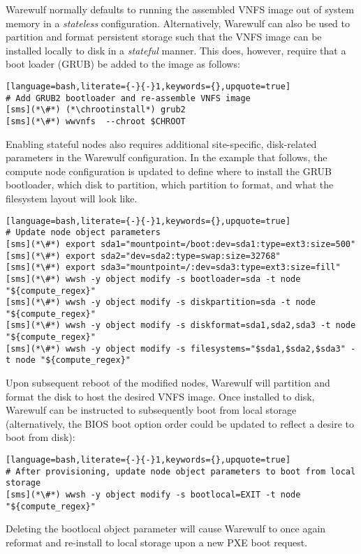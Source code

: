 Warewulf normally defaults to running the assembled VNFS image out of system
memory in a {\em stateless} configuration. Alternatively, Warewulf can also be
used to partition and format persistent storage such that the VNFS image can be
installed locally to disk in a {\em stateful} manner.  This does, however,
require that a boot loader (GRUB) be added to the image as follows:

\begin{lstlisting}[language=bash,literate={-}{-}1,keywords={},upquote=true]
# Add GRUB2 bootloader and re-assemble VNFS image
[sms](*\#*) (*\chrootinstall*) grub2
[sms](*\#*) wwvnfs  --chroot $CHROOT
\end{lstlisting}

\noindent Enabling stateful nodes also requires additional site-specific, disk-related
parameters in the Warewulf configuration. In the example that follows, the
compute node configuration is updated to define where to install the GRUB
bootloader, which disk to partition, which partition to format, and what the
filesystem layout will look like.

\begin{lstlisting}[language=bash,literate={-}{-}1,keywords={},upquote=true]
# Update node object parameters
[sms](*\#*) export sda1="mountpoint=/boot:dev=sda1:type=ext3:size=500"
[sms](*\#*) export sda2="dev=sda2:type=swap:size=32768"
[sms](*\#*) export sda3="mountpoint=/:dev=sda3:type=ext3:size=fill"
[sms](*\#*) wwsh -y object modify -s bootloader=sda -t node "${compute_regex}" 
[sms](*\#*) wwsh -y object modify -s diskpartition=sda -t node "${compute_regex}" 
[sms](*\#*) wwsh -y object modify -s diskformat=sda1,sda2,sda3 -t node "${compute_regex}" 
[sms](*\#*) wwsh -y object modify -s filesystems="$sda1,$sda2,$sda3" -t node "${compute_regex}" 
\end{lstlisting}

\noindent Upon subsequent reboot of the modified nodes, Warewulf will partition
and format the disk to host the desired VNFS image.  Once installed to disk,
Warewulf can be instructed to subsequently boot from local storage
(alternatively, the BIOS boot option order could be updated to reflect a desire
to boot from disk):

\begin{lstlisting}[language=bash,literate={-}{-}1,keywords={},upquote=true]
# After provisioning, update node object parameters to boot from local storage
[sms](*\#*) wwsh -y object modify -s bootlocal=EXIT -t node "${compute_regex}"
\end{lstlisting}


\noindent Deleting the bootlocal object parameter will cause Warewulf to once
again reformat and re-install to local storage upon a new PXE boot request.
